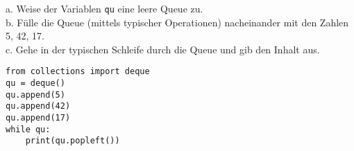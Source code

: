 \question[3] a. Weise der Variablen \texttt{qu} eine leere Queue zu. \\
b. Fülle die Queue (mittels typischer Operationen)
nacheinander mit den Zahlen 5, 42, 17. \\
c. Gehe in der typischen Schleife durch die Queue und gib den Inhalt aus.
\begin{solutionbox}{5cm}
\begin{lstlisting}
from collections import deque
qu = deque()
qu.append(5)
qu.append(42)
qu.append(17)
while qu:
    print(qu.popleft())
\end{lstlisting}
\end{solutionbox}
